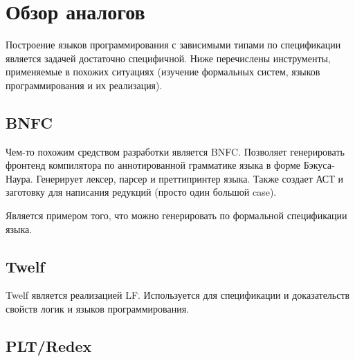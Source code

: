 \section{Обзор аналогов}
Построение языков программирования с зависимыми типами по спецификации является задачей достаточно специфичной. Ниже перечислены инструменты, применяемые в похожих ситуациях (изучение формальных систем, языков программирования и их реализация).

\subsection{BNFC}
Чем-то похожим средством разработки является BNFC\cite{bnfc}. Позволяет генерировать фронтенд компилятора по аннотированной грамматике языка в форме Бэкуса-Наура. Генерирует лексер, парсер и преттипринтер языка. Также создает АСТ и заготовку для написания редукций (просто один большой case).

Является примером того, что можно генерировать по формальной спецификации языка.

\subsection{Twelf}
Twelf\cite{twelf} является реализацией LF\cite{Pfenning2002}. Используется для спецификации и доказательств свойств логик и языков программирования.

\subsection{PLT/Redex}





